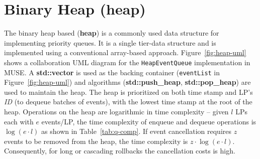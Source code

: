 \section{Binary Heap (heap)} 
The binary heap based (\textbf{heap}) is a commonly used data structure for implementing priority queues. It is a single tier-data structure and is implemented using a conventional array-based approach.  Figure~\ref{fig:heap-uml} shows a collaboration UML diagram for the \texttt{HeapEventQueue} implementation in MUSE.   A \textbf{std::vector} is used as the backing container (\texttt{eventList} in Figure~\ref{fig:heap-uml}) and algorithms (\textbf{std::push\_heap}, \textbf{std::pop\_heap}) are used to maintain the heap. The heap is prioritized on both time stamp and LP's \emph{ID} (to dequeue batches of events), with the lowest time stamp at the root of the heap. Operations on the heap are logarithmic in time complexity -- given $l$ LPs each with $e$ events/LP, the time complexity of enqueue and dequeue operations is $\log(e\cdot l)$ as shown in Table~\ref{tab:q-comp}. If event cancellation requires $z$ events to be removed from the heap, the time complexity is $z\cdot \log(e\cdot l)$. Consequently, for long or cascading rollbacks the cancellation costs is high.

